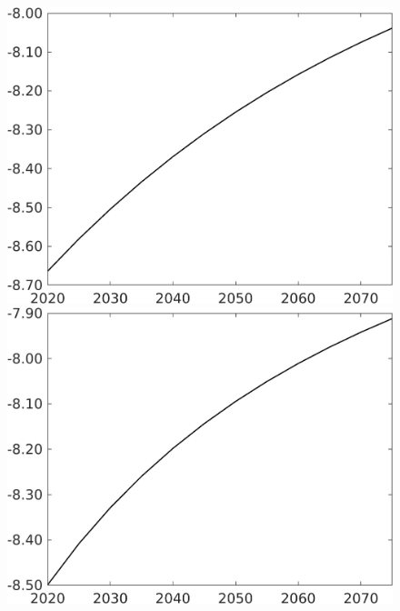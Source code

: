 \begin{figure}[h!!]
\begin{minipage}[]{0.32\textwidth}
	\end{minipage}		
	\begin{minipage}[]{0.32\textwidth}
		\includegraphics[width=1\textwidth]{../../codding_model/own_basedOnFried/optimalPol_010922_revision/figures/all_13Sept22/CompTaul_LFBAUPer_Reg0_wsg_spillover0_nsk1_xgr0_sep1_countec0_GovRev1_etaa0.79.png}
	\end{minipage}		
	\begin{minipage}[]{0.32\textwidth}
		\includegraphics[width=1\textwidth]{../../codding_model/own_basedOnFried/optimalPol_010922_revision/figures/all_13Sept22/CompTaul_LFBAUPer_Reg0_wsn_spillover0_nsk1_xgr0_sep1_countec0_GovRev1_etaa0.79.png}
	\end{minipage}	
\end{figure}

